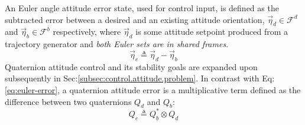 An Euler angle attitude error state, used for control input, is defined as the subtracted error between a desired and an existing attitude orientation, $\vec{\eta}_d\in\mathcal{F}^d$ and $\vec{\eta}_b\in\mathcal{F}^b$ respectively, where $\vec{\eta}_d$ is some attitude setpoint produced from a trajectory generator and \emph{both Euler sets are in shared frames}.
\begin{equation}\label{eq:euler-error}
\vec{\eta}_e\triangleq\vec{\eta}_d-\vec{\eta}_b
\end{equation}
Quaternion attitude control and its stability goals are expanded upon subsequently in Sec:\ref{subsec:control.attitude.problem}. In contrast with Eq:\ref{eq:euler-error}, a quaternion attitude error is a multiplicative term defined as the difference between two quaternions $Q_d$ and $Q_b$:
\begin{equation}\label{eq:quaternion-error}
Q_e\triangleq Q_b^*\otimes Q_d
\end{equation}
